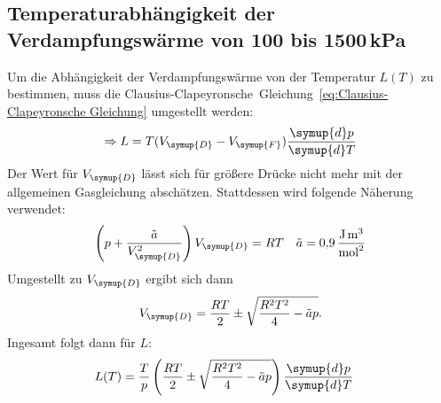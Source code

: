 \subsection{Temperaturabhängigkeit der Verdampfungswärme von 100 bis 1500\,kPa}
\label{sec:Auswertung_2}
Um die Abhängigkeit der Verdampfungswärme von der Temperatur $L(T)$ zu bestimmen, muss die 
Clausius-Clapeyronsche~Gleichung~\eqref{eq:Clausius-Clapeyronsche Gleichung} umgestellt werden:
\begin{align*}
  \Rightarrow L = T(V_{\symup{D}}-V_{\symup{F}})\frac{\symup{d}p}{\symup{d}T}
\end{align*}
Der Wert für $V_{\symup{D}}$ lässt sich für größere Drücke nicht mehr mit der allgemeinen Gasgleichung abschätzen. Stattdessen wird folgende Näherung
verwendet:
\begin{align*}
  \left(p+\frac{\tilde{a}}{V_{\symup{D}}^2}\right)V_{\symup{D}} &= RT  &  \tilde{a} &= \qty{0.9}{\joule\cubic\metre\per\square\mol} \\
\end{align*}
Umgestellt zu $V_{\symup{D}}$ ergibt sich dann
\begin{align*}
  V_{\symup{D}} = \frac{RT}{2}\pm\sqrt{\frac{R^2T^2}{4}-\tilde{a}p}.
\end{align*}
Ingesamt folgt dann für $L$:
\begin{align}
  L(T) &= \frac{T}{p}\left(\frac{RT}{2}\pm\sqrt{\frac{R^2T^2}{4}-\tilde{a}p}\right)\frac{\symup{d}p}{\symup{d}T}
  \label{eq:L(T)}
\end{align}

